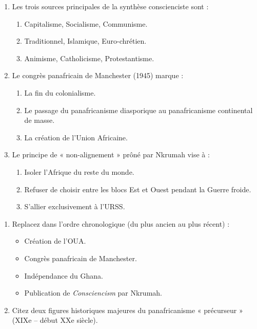 \documentclass[11pt]{article}
\begin{document}
\begin{exercice}
\begin{enumerate}
    \item Les trois sources principales de la synthèse conscienciste sont :
    \begin{enumerate}
        \item Capitalisme, Socialisme, Communisme.
        \item Traditionnel, Islamique, Euro-chrétien.
        \item Animisme, Catholicisme, Protestantisme.
    \end{enumerate}
    \item Le congrès panafricain de Manchester (1945) marque :
    \begin{enumerate}
        \item La fin du colonialisme.
        \item Le passage du panafricanisme diasporique au panafricanisme continental de masse.
        \item La création de l'Union Africaine.
    \end{enumerate}
    \item Le principe de « non-alignement » prôné par Nkrumah vise à :
    \begin{enumerate}
        \item Isoler l'Afrique du reste du monde.
        \item Refuser de choisir entre les blocs Est et Ouest pendant la Guerre froide.
        \item S'allier exclusivement à l'URSS.
    \end{enumerate}
\end{enumerate}
\end{exercice}

\begin{exercice}
\begin{enumerate}
    \item Replacez dans l'ordre chronologique (du plus ancien au plus récent) :
    \begin{itemize}
        \item Création de l'OUA.
        \item Congrès panafricain de Manchester.
        \item Indépendance du Ghana.
        \item Publication de \textit{Consciencism} par Nkrumah.
    \end{itemize}
    \item Citez deux figures historiques majeures du panafricanisme « précurseur » (XIXe – début XXe siècle).
\end{enumerate}
\end{exercice}
\end{document}
